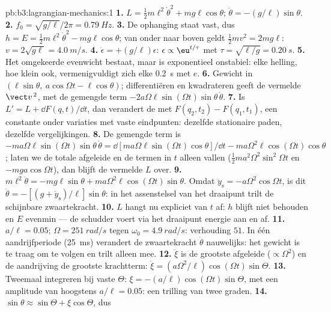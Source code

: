 \begin{solution}{pb:b3:lagrangian-mechanics:1}
\textbf{1.} $L = \tfrac12 m\ell^2\dot\theta^2 + mg\ell\cos\theta$;
$\ddot\theta = -(g/\ell)\sin\theta$.
\textbf{2.} $f_0 = \sqrt{g/\ell}/2\pi = \qty{0.79}{Hz}$.
\textbf{3.} De ophanging staat vast, dus $h = E = \tfrac12
m\ell^2\dot\theta^2 - mg\ell\cos\theta$; van onder naar boven geldt
$\tfrac12
mv^2 = 2mg\ell$: $v = 2\sqrt{g\ell} = \qty{4.0}{m/s}$.
\textbf{4.} $\ddot\epsilon = +(g/\ell)\epsilon$: $\epsilon \propto
\eu^{t/\tau}$ met $\tau = \sqrt{\ell/g} = \qty{0.20}{s}$.
\textbf{5.} Het omgekeerde evenwicht bestaat, maar is exponentieel
onstabiel: elke helling, hoe klein ook, vermenigvuldigt zich elke
\qty{0.2}{s} met $e$.
\textbf{6.} Gewicht in $(\ell\sin\theta,\ a\cos\Omega t - \ell\cos\theta)$; differentiëren en kwadrateren geeft de vermelde
$\vect v^{\,2}$, met de gemengde term
$-2a\Omega\ell\sin(\Omega t)\sin\theta\,\dot\theta$.
\textbf{7.} Is $L' = L + \dd F(q,t)/\dd t$, dan verandert de  met
$F(q_2, t_2) - F(q_1, t_1)$, een constante onder variaties met vaste
eindpunten: dezelfde stationaire paden, dezelfde vergelijkingen.
\textbf{8.} De gemengde term is $-ma\Omega\ell\sin(\Omega t)\sin\theta\,
\dot\theta = \dd[ma\Omega\ell\sin(\Omega t)\cos\theta]/\dd t -
ma\Omega^2\ell\cos(\Omega t)\cos\theta$; laten we de totale afgeleide en
de termen in $t$ alleen vallen ($\tfrac12 ma^2\Omega^2\sin^2\Omega t$ en
$-mga\cos\Omega t$), dan blijft de vermelde $L$ over.
\textbf{9.} $m\ell^2\ddot\theta = -mg\ell\sin\theta +
ma\Omega^2\ell\cos(\Omega t)\sin\theta$. Omdat $\ddot y_{\text{s}} =
-a\Omega^2\cos\Omega t$, is dit $\ddot\theta =
-[(g + \ddot y_{\text{s}})/\ell]\sin\theta$: in het assenstelsel van het
draaipunt trilt de schijnbare zwaartekracht.
\textbf{10.} $L$ hangt nu expliciet van $t$ af: $h$ blijft niet behouden
en $E$ evenmin --- de schudder voert via het draaipunt energie aan en af.
\textbf{11.} $a/\ell = 0.05$; $\Omega = \qty{251}{rad/s}$ tegen
$\omega_0 = \qty{4.9}{rad/s}$: verhouding $51$. In één aandrijfperiode
(\qty{25}{ms}) verandert de zwaartekracht $\dot\theta$ nauwelijks: het
gewicht is te traag om te volgen en trilt alleen mee.
\textbf{12.} $\ddot\xi$ is de grootste afgeleide ($\propto\Omega^2$) en
de aandrijving de grootste krachtterm: $\ddot\xi =
(a\Omega^2/\ell)\cos(\Omega t)\sin\Theta$.
\textbf{13.} Tweemaal integreren bij vaste $\Theta$: $\xi =
-(a/\ell)\cos(\Omega t)\sin\Theta$, met een amplitude van hoogstens
$a/\ell =
0.05$: een trilling van twee graden.
\textbf{14.} $\sin\theta \approx \sin\Theta + \xi\cos\Theta$, dus

\end{solution}
